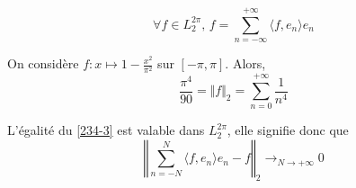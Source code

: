 	\begin{corollary}
		\label{234-3}
		\[ \forall f \in L_2^{2 \pi}, \, f = \sum_{n = -\infty}^{+\infty} \langle f, e_n \rangle e_n \]
	\end{corollary}


	\begin{example}
		On considère $f : x \mapsto 1 - \frac{x^2}{\pi^2}$ sur $[-\pi, \pi]$. Alors,
		\[ \frac{\pi^4}{90} = \Vert f \Vert_2 = \sum_{n=0}^{+\infty} \frac{1}{n^4} \]
	\end{example}


	\begin{remark}
		L'égalité du \cref{234-3} est valable dans $L_2^{2\pi}$, elle signifie donc que
		\[ \left\Vert \sum_{n = -N}^{N} \langle f, e_n \rangle e_n - f \right\Vert_2 \longrightarrow_{N \rightarrow +\infty} 0 \]
	\end{remark}

